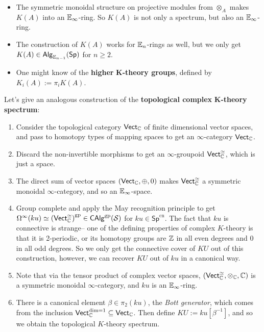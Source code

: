 \begin{example}
\begin{itemize}
    \item The symmetric monoidal structure on projective modules from  $\otimes_A$ makes  $K(A)$ into an $\mathbb{E}_{\infty}$-ring. So $K(A)$ is not only a spectrum, but also an $\mathbb{E}_{\infty}$-ring.
    \item The construction of $K(A)$ works for $\mathbb{E}_n $-rings as well, but we only get $K(A) \in \mathsf{Alg} _{\mathbb{E}_{n-1}}(\mathsf{Sp} )$ for $n \geq 2$.
    \item One might know of the \textbf{higher} $\mathbf K$\textbf{-theory groups}, defined by $K_i (A):= \pi_i K(A)$.
\end{itemize}
\end{example}

\begin{example}
    Let's give an analogous construction of the \textbf{topological complex} $\mathbf K$\textbf{-theory spectrum}:
    \begin{enumerate}[label=(\arabic*)]
    \setlength\itemsep{-.2em}
\item Consider the topological category $\mathsf{Vect} _{\mathbb{C}}$ of finite dimensional vector spaces, and pass to homotopy types of mapping spaces to get an $\infty$-category $\mathsf{Vect} _{\mathbb{C}}$. 
\item Discard the non-invertible morphisms to get an $\infty$-groupoid $\mathsf{Vect} _{\mathbb{C}}^{\simeq }$, which is just a space.
\item The direct sum of vector spaces $(\mathsf{Vect} _{\mathbb{C}},\oplus, 0)$ makes $\mathsf{Vect} _{\mathbb{C}}^{\simeq }$ a symmetric monoidal $\infty$-category, and so an $\mathbb{E}_{\infty}$-space.
\item Group complete and apply the May recognition principle to get $\Omega^{\infty}(ku) \simeq  \left( \mathsf{Vect} _{\mathbb{C}}^{\simeq } \right) ^{\mathrm{gp}} \in \mathsf{CAlg} ^{\mathrm{gp}}(\mathcal{S} )$ for $ku \in \mathsf{Sp} ^{\mathrm{cn}}.$ The fact that $ku$ is connective is strange-- one of the defining properties of complex $K$-theory is that it is 2-periodic, or its homotopy groups are $\mathbb{Z}$ in all even degrees and 0 in all odd degrees. So we only get the connective cover of $KU$ out of this construction, however, we can recover $KU$ out of $ku$ in a canonical way.
\item Note that via the tensor product of complex vector spaces, $(\mathsf{Vect} ^{\simeq }_{\mathbb{C}},\otimes _{\mathbb{C}}, \mathbb{C})$ is a symmetric monoidal $\infty$-category, and $ku$ is an $\mathbb{E}_{\infty}$-ring.
\item There is a canonical element $\beta \in \pi_2(ku)$, the \emph{Bott generator}, which comes from the inclusion $\mathsf{Vect} ^{\dim=1}_{\mathbb{C}}\subseteq \mathsf{Vect} _{\mathbb{C}}$. Then define $KU:= ku[\beta ^{-1}]$, and so we obtain the topological $K$-theory spectrum.
    \end{enumerate}
\end{example}

